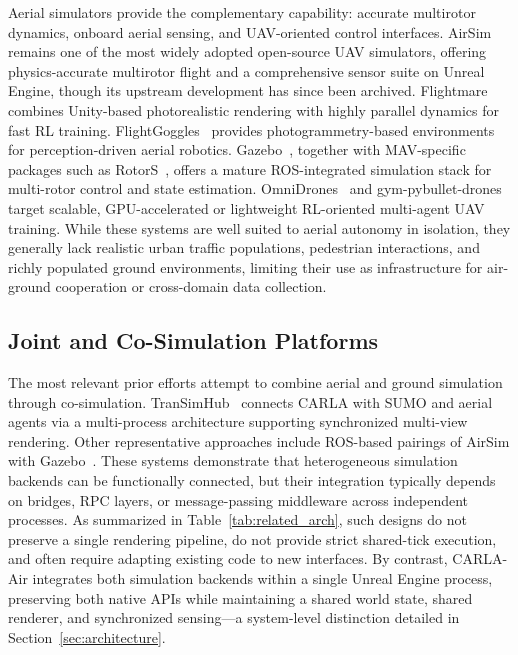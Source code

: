 Aerial simulators provide the complementary capability: accurate multirotor
dynamics, onboard aerial sensing, and UAV-oriented control interfaces.
AirSim~\cite{airsim} remains one of the most widely adopted open-source UAV
simulators, offering physics-accurate multirotor flight and a comprehensive
sensor suite on Unreal Engine, though its upstream development has since been
archived.
Flightmare~\cite{flightmare} combines Unity-based photorealistic rendering
with highly parallel dynamics for fast RL training.
FlightGoggles~\cite{flightgoggles} provides photogrammetry-based environments
for perception-driven aerial robotics.
Gazebo~\cite{gazebo}, together with MAV-specific packages such as
RotorS~\cite{rotorsim}, offers a mature ROS-integrated simulation stack for
multi-rotor control and state estimation.
OmniDrones~\cite{omnidrones} and
gym-pybullet-drones~\cite{pybulletdrones} target scalable, GPU-accelerated or
lightweight RL-oriented multi-agent UAV training.
While these systems are well suited to aerial autonomy in isolation, they
generally lack realistic urban traffic populations, pedestrian interactions, and
richly populated ground environments, limiting their use as infrastructure for
air-ground cooperation or cross-domain data collection.

\subsection{Joint and Co-Simulation Platforms}
\label{sec:related:joint}

The most relevant prior efforts attempt to combine aerial and ground simulation
through co-simulation.
TranSimHub~\cite{transimhub} connects CARLA with SUMO and aerial agents via a
multi-process architecture supporting synchronized multi-view rendering.
Other representative approaches include ROS-based pairings of AirSim with
Gazebo~\cite{airsim,gazebo,ros2}.
These systems demonstrate that heterogeneous simulation backends can be
functionally connected, but their integration typically depends on bridges, RPC
layers, or message-passing middleware across independent processes.
As summarized in Table~\ref{tab:related_arch}, such designs do not preserve a
single rendering pipeline, do not provide strict shared-tick execution, and
often require adapting existing code to new interfaces.
By contrast, CARLA-Air integrates both simulation backends within a single
Unreal Engine process, preserving both native APIs while maintaining a shared
world state, shared renderer, and synchronized sensing---a system-level
distinction detailed in Section~\ref{sec:architecture}.

